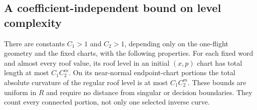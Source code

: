 \subsection{A coefficient-independent bound on level complexity}
\begin{lemma}
\label{lem:v44-level-complexity}
There are constants $C_1>1$ and $C_2>1$, depending only on the
one-flight geometry and the fixed charts, with the following properties.
For each fixed word and almost every roof value, its roof level in an
initial $(x,p)$ chart has total length at most $C_1C_2^m$.
On its near-normal endpoint-chart portions the total absolute curvature
of the regular roof level is at most $C_1C_2^m$.
These bounds are uniform in $R$ and require no distance from singular
or decision boundaries. They count every connected portion, not only
one selected inverse curve.
\end{lemma}

